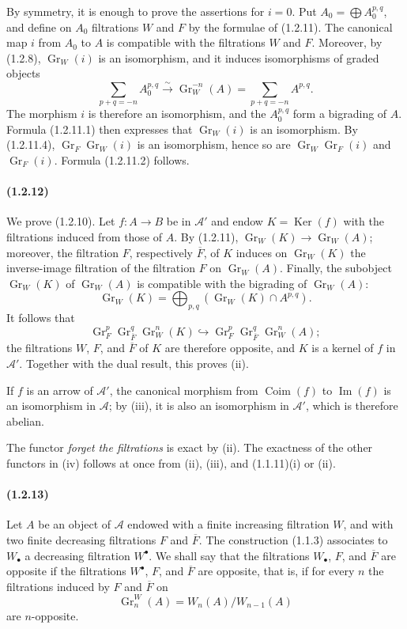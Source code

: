 \documentclass[10pt]{article}
\newcommand{\Gr}{\operatorname{Gr}}
\newcommand{\Ker}{\operatorname{Ker}}
\newcommand{\Coim}{\operatorname{Coim}}
\newcommand{\Imop}{\operatorname{Im}}
\newcommand{\calA}{\mathcal A}
\newcommand{\iso}{\xrightarrow{\sim}}
\begin{document}
By symmetry, it is enough to prove the assertions for $i=0$. Put $A_0=\bigoplus A_0^{p,q}$, and define on $A_0$ filtrations $W$ and $F$ by the formulae of (1.2.11). The canonical map $i$ from $A_0$ to $A$ is compatible with the filtrations $W$ and $F$. Moreover, by (1.2.8), $\Gr_W(i)$ is an isomorphism, and it induces isomorphisms of graded objects
\[
\tag{1.2.11.4}
\sum_{p+q=-n} A_0^{p,q}\iso \Gr_W^{-n}(A)=\sum_{p+q=-n}A^{p,q}.
\]
The morphism $i$ is therefore an isomorphism, and the $A_0^{p,q}$ form a bigrading of $A$. Formula (1.2.11.1) then expresses that $\Gr_W(i)$ is an isomorphism. By (1.2.11.4), $\Gr_F\Gr_W(i)$ is an isomorphism, hence so are $\Gr_W\Gr_F(i)$ and $\Gr_F(i)$. Formula (1.2.11.2) follows.

\paragraph{(1.2.12)} We prove (1.2.10). Let $f:A\to B$ be in $\calA'$ and endow $K=\Ker(f)$ with the filtrations induced from those of $A$. By (1.2.11), $\Gr_W(K)\to\Gr_W(A)$; moreover, the filtration $F$, respectively $\overline F$, of $K$ induces on $\Gr_W(K)$ the inverse-image filtration of the filtration $F$ on $\Gr_W(A)$. Finally, the subobject $\Gr_W(K)$ of $\Gr_W(A)$ is compatible with the bigrading of $\Gr_W(A)$:
\[
\Gr_W(K)=\bigoplus_{p,q}(\Gr_W(K)\cap A^{p,q}).
\]
It follows that
\[
\Gr_F^p\Gr_{\overline F}^{q}\Gr_W^n(K)\hookrightarrow \Gr_F^p\Gr_{\overline F}^{q}\Gr_W^n(A);
\]
the filtrations $W$, $F$, and $\overline F$ of $K$ are therefore opposite, and $K$ is a kernel of $f$ in $\calA'$. Together with the dual result, this proves (ii).

If $f$ is an arrow of $\calA'$, the canonical morphism from $\Coim(f)$ to $\Imop(f)$ is an isomorphism in $\calA$; by (iii), it is also an isomorphism in $\calA'$, which is therefore abelian.

The functor \emph{forget the filtrations} is exact by (ii). The exactness of the other functors in (iv) follows at once from (ii), (iii), and (1.1.11)(i) or (ii).

\paragraph{(1.2.13)} Let $A$ be an object of $\calA$ endowed with a finite increasing filtration $W$, and with two finite decreasing filtrations $F$ and $\overline F$. The construction (1.1.3) associates to $W_\bullet$ a decreasing filtration $W^\bullet$. We shall say that the filtrations $W_\bullet$, $F$, and $\overline F$ are opposite if the filtrations $W^\bullet$, $F$, and $\overline F$ are opposite, that is, if for every $n$ the filtrations induced by $F$ and $\overline F$ on
\[
\Gr_n^W(A)=W_n(A)/W_{n-1}(A)
\]
are $n$-opposite.
\end{document}
